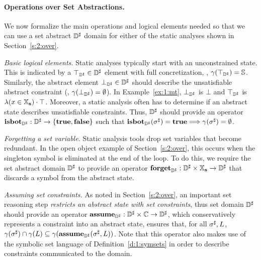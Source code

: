 \paragraph{Operations over Set Abstractions.}
We now formalize the main operations and logical elements needed so that
we can use a set abstract \( {\mathbb{D}}^{\sharp} \) domain for either of the static
analyses shown in Section~\ref{s:2:over}.
\begin{asparaitem}
\item \emph{Basic logical elements.}
  Static analyses typically start with an unconstrained state.
  This is indicated by a \( \top_{{\mathbb{D}}^{\sharp}} \in {\mathbb{D}}^{\sharp} \) element with full
  concretization, \ie, \( \gamma( \top_{{\mathbb{D}}^{\sharp}} ) = \mathbb{S} \).
  Similarly, the abstract element \( \bot_{{\mathbb{D}}^{\sharp}} \in {\mathbb{D}}^{\sharp} \) should describe
  the unsatisfiable abstract constraint (\ie, \( \gamma( \bot_{{\mathbb{D}}^{\sharp}} ) =
  \emptyset \)).
  In Example~\ref{ex:1:mt}, \( \bot_{{\mathbb{D}}^{\sharp}} \) is \( \bot \) and \( \top_{{\mathbb{D}}^{\sharp}} \)
  is \( \lambda (x \in \mathbb{X}_{\bf s}) \cdot \top \).
  Moreover, a static analysis often has to determine if an abstract state
  describes unsatisfiable constraints.
  Thus, \( {\mathbb{D}}^{\sharp} \) should provide an operator \( \textbf{isbot}_{{\mathbb{D}}^{\sharp}}: {\mathbb{D}}^{\sharp}
  \rightarrow \{ \mathbf{true}, \mathbf{false} \} \) such that \( \textbf{isbot}_{{\mathbb{D}}^{\sharp}}( {\sigma}^{\sharp} )
  = \mathbf{true} \Longrightarrow \gamma( {\sigma}^{\sharp} ) = \emptyset \).

\item \emph{Forgetting a set variable.}
  Static analysis tools drop set variables that become redundant.
  In the open object example of Section~\ref{s:2:over}, this occurs when
  the singleton symbol is eliminated at the end of the loop.
  To do this, we require the set abstract domain \( {\mathbb{D}}^{\sharp} \) to provide
  an operator \( \textbf{forget}_{{\mathbb{D}}^{\sharp}}: {\mathbb{D}}^{\sharp} \times \mathbb{X}_{\bf s} \rightarrow {\mathbb{D}}^{\sharp} \)
  that discards a symbol from the abstract state.

\item \emph{Assuming set constraints.}
  As noted in Section~\ref{s:2:over}, an important set reasoning step
  {\em restricts an abstract state with set constraints}, thus set
  domain \( {\mathbb{D}}^{\sharp} \) should provide an operator \( \textbf{assume}_{{\mathbb{D}}^{\sharp}}: {\mathbb{D}}^{\sharp}
  \times \mathbb{C} \rightarrow {\mathbb{D}}^{\sharp} \), which conservatively represents
  a constraint into an abstract state, \ie ensures that, for all
  \( {\sigma}^{\sharp}, L \), \( \gamma( {\sigma}^{\sharp} ) \cap \gamma( L ) \subseteq
  \gamma( \textbf{assume}_{{\mathbb{D}}^{\sharp}}( {\sigma}^{\sharp}, L ) ) \).
  Note that this operator also makes use of the symbolic set language
  of Definition~\ref{d:1:symsets} in order to describe constraints
  communicated to the domain.
  

\end{asparaitem}
